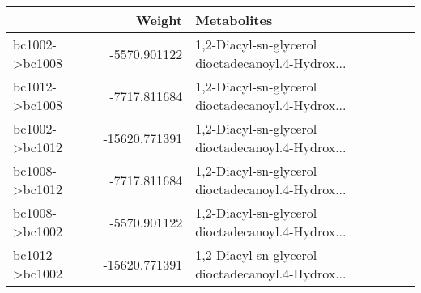 \begin{tabular}{lrl}
\toprule
{} &        Weight &                                        Metabolites \\
\midrule
bc1002->bc1008 &  -5570.901122 &  1,2-Diacyl-sn-glycerol dioctadecanoyl.4-Hydrox... \\
bc1012->bc1008 &  -7717.811684 &  1,2-Diacyl-sn-glycerol dioctadecanoyl.4-Hydrox... \\
bc1002->bc1012 & -15620.771391 &  1,2-Diacyl-sn-glycerol dioctadecanoyl.4-Hydrox... \\
bc1008->bc1012 &  -7717.811684 &  1,2-Diacyl-sn-glycerol dioctadecanoyl.4-Hydrox... \\
bc1008->bc1002 &  -5570.901122 &  1,2-Diacyl-sn-glycerol dioctadecanoyl.4-Hydrox... \\
bc1012->bc1002 & -15620.771391 &  1,2-Diacyl-sn-glycerol dioctadecanoyl.4-Hydrox... \\
\bottomrule
\end{tabular}

